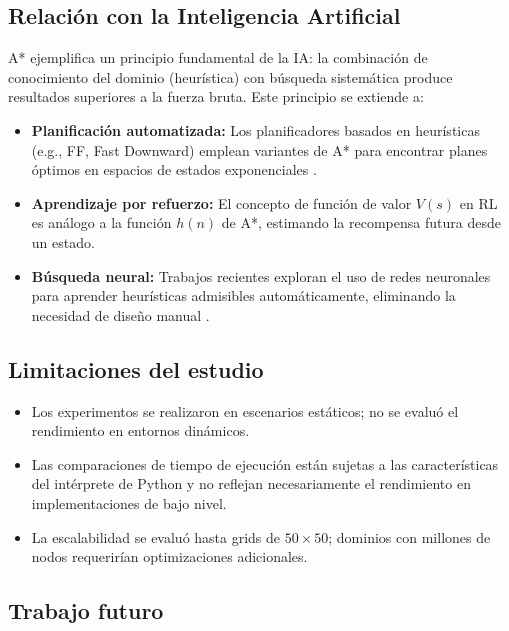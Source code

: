 \subsection{Relación con la Inteligencia Artificial}

A* ejemplifica un principio fundamental de la IA: la combinación de conocimiento del dominio (heurística) con búsqueda sistemática produce resultados superiores a la fuerza bruta. Este principio se extiende a:

\begin{itemize}
    \item \textbf{Planificación automatizada:} Los planificadores basados en heurísticas (e.g., FF, Fast Downward) emplean variantes de A* para encontrar planes óptimos en espacios de estados exponenciales \cite{helmert2006fast}.
    
    \item \textbf{Aprendizaje por refuerzo:} El concepto de función de valor $V(s)$ en RL es análogo a la función $h(n)$ de A*, estimando la recompensa futura desde un estado.
    
    \item \textbf{Búsqueda neural:} Trabajos recientes exploran el uso de redes neuronales para aprender heurísticas admisibles automáticamente, eliminando la necesidad de diseño manual \cite{arfaee2011learning}.
\end{itemize}

\subsection{Limitaciones del estudio}

\begin{itemize}
    \item Los experimentos se realizaron en escenarios estáticos; no se evaluó el rendimiento en entornos dinámicos.
    \item Las comparaciones de tiempo de ejecución están sujetas a las características del intérprete de Python y no reflejan necesariamente el rendimiento en implementaciones de bajo nivel.
    \item La escalabilidad se evaluó hasta grids de $50 \times 50$; dominios con millones de nodos requerirían optimizaciones adicionales.
\end{itemize}

\subsection{Trabajo futuro}

